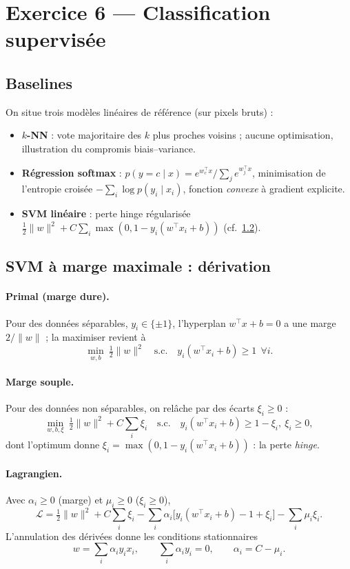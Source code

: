 \documentclass[11pt,a4paper]{article}
\newcommand{\norm}[1]{\lVert #1 \rVert}
\newcommand{\T}{^{\top}}
\begin{document}
\section{Exercice 6 — Classification supervisée}

\subsection{Baselines}
On situe trois modèles linéaires de référence (sur pixels bruts) :
\begin{itemize}\itemsep2pt
  \item \textbf{$k$-NN} : vote majoritaire des $k$ plus proches voisins ; aucune
  optimisation, illustration du compromis biais–variance.
  \item \textbf{Régression softmax} : $p(y=c\mid x)=e^{w_c\T x}/\sum_j e^{w_j\T x}$,
  minimisation de l'entropie croisée $-\sum_i\log p(y_i\mid x_i)$, fonction
  \emph{convexe} à gradient explicite.
  \item \textbf{SVM linéaire} : perte hinge régularisée
  $\tfrac12\norm{w}^2+C\sum_i\max(0,1-y_i(w\T x_i+b))$ (cf.~\ref{sec:svm}).
\end{itemize}

\subsection{SVM à marge maximale : dérivation}\label{sec:svm}
\paragraph{Primal (marge dure).} Pour des données séparables, $y_i\in\{\pm1\}$,
l'hyperplan $w\T x+b=0$ a une marge $2/\norm{w}$ ; la maximiser revient à
\begin{equation}
\min_{w,b}\ \tfrac12\norm{w}^2
\quad\text{s.c.}\quad y_i(w\T x_i+b)\ge 1 \ \ \forall i .
\end{equation}
\paragraph{Marge souple.} Pour des données non séparables, on relâche par des
écarts $\xi_i\ge0$ :
\begin{equation}
\min_{w,b,\xi}\ \tfrac12\norm{w}^2 + C\sum_i\xi_i
\quad\text{s.c.}\quad y_i(w\T x_i+b)\ge 1-\xi_i,\ \xi_i\ge0 ,
\end{equation}
dont l'optimum donne $\xi_i=\max(0,1-y_i(w\T x_i+b))$ : la perte \emph{hinge}.
\paragraph{Lagrangien.} Avec $\alpha_i\ge0$ (marge) et $\mu_i\ge0$ ($\xi_i\ge0$),
\[
\mathcal L=\tfrac12\norm{w}^2+C\sum_i\xi_i
-\sum_i\alpha_i\big[y_i(w\T x_i+b)-1+\xi_i\big]-\sum_i\mu_i\xi_i .
\]
L'annulation des dérivées donne les conditions stationnaires
\begin{equation}
w=\sum_i\alpha_i y_i x_i,\qquad
\sum_i\alpha_i y_i=0,\qquad
\alpha_i = C-\mu_i .
\end{equation}
\end{document}
